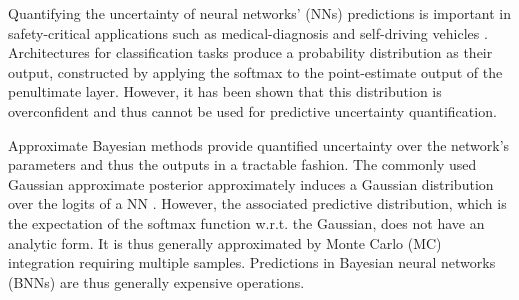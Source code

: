 Quantifying the uncertainty of neural networks' (NNs) predictions is important in safety-critical applications such as medical-diagnosis \cite{UIinMedicine} and self-driving vehicles \cite{McAllister2017ConcretePF,AutoDrivingBayes}.
Architectures for classification tasks produce a probability distribution as their output, constructed by applying the softmax to the point-estimate output of the penultimate layer.
However, it has been shown that this distribution is overconfident \citep{nguyen2015deep,Hein_2019_CVPR} and thus cannot be used for predictive uncertainty quantification.

Approximate Bayesian methods provide quantified uncertainty over the network's parameters and thus the outputs in a tractable fashion. The commonly used Gaussian approximate posterior \citep{MacKay1992,Graves2011VB,Blundell2015WeightUI,ritter2018a} approximately induces a Gaussian distribution over the logits of a NN \citep{McKay1995NetworkBayesReview}. However, the associated predictive distribution, which is the expectation of the softmax function w.r.t. the Gaussian, does not have an analytic form.
It is thus generally approximated by Monte Carlo (MC) integration requiring multiple samples. Predictions in Bayesian neural networks (BNNs) are thus generally expensive operations.

